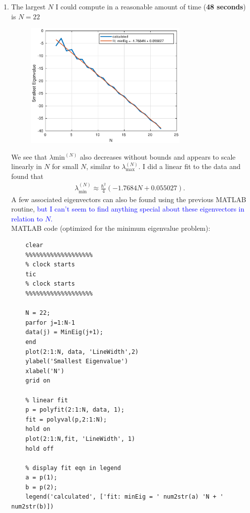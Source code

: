 \documentclass{article}
\theoremstyle{definition}
\newcommand{\f}[2]{\frac{#1}{#2}}
\newcommand{\lp}{\left(}
\newcommand{\rp}{\right)}
\begin{document}
\begin{enumerate}[label=(\alph*)]
	\item The largest $N$ I could compute in a reasonable amount of time (\textbf{48 seconds}) is $\boxed{N=22}$
	\begin{figure}[!htb]
		\centering
		\includegraphics[width=0.75\textwidth]{2f.eps}
	\end{figure}

 
	We see that $\lambda{\text{min}}^{(N)}$ also decreases without bounds and appears to scale linearly in $N$ for small $N$, similar to $\lambda_\text{max}^{(N)}$. I did a linear fit to the data and found that 
	\begin{align*}
	\lambda_\text{min}^{(N)} \approx \f{\hbar^2}{4}\lp -1.7684N + 0.055027\rp .
	\end{align*} 
	A few associated eigenvectors can also be found using the previous MATLAB routine, \textcolor{blue}{but I can't seem to find anything special about these eigenvectors in relation to $N$.}\\
	
	
	
	
	
	MATLAB code (optimized for the minimum eigenvalue problem):
	\begin{lstlisting}
	clear 
	%%%%%%%%%%%%%%%%%%%
	% clock starts
	tic 
	% clock starts
	%%%%%%%%%%%%%%%%%%%
	
	N = 22;
	parfor j=1:N-1
	data(j) = MinEig(j+1);
	end
	plot(2:1:N, data, 'LineWidth',2)
	ylabel('Smallest Eigenvalue')
	xlabel('N')
	grid on
	
	% linear fit
	p = polyfit(2:1:N, data, 1);
	fit = polyval(p,2:1:N);
	hold on
	plot(2:1:N,fit, 'LineWidth', 1)
	hold off
	
	% display fit eqn in legend
	a = p(1);
	b = p(2);
	legend('calculated', ['fit: minEig = ' num2str(a) 'N + ' num2str(b)])
	

\end{lstlisting}
\end{enumerate}
\end{document}

